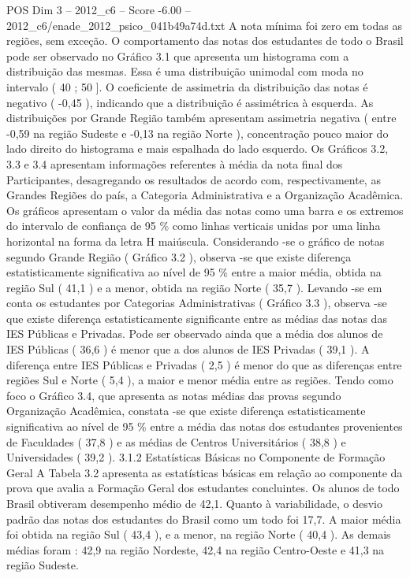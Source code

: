 \begin{textsample}{POS Dim 3 – 2012\_c6 – Score -6.00 – 2012\_c6/enade\_2012\_psico\_041b49a74d.txt}
A nota mínima foi zero em todas as regiões, sem exceção.
O comportamento das notas dos estudantes de todo o Brasil pode ser observado no Gráfico 3.1 que apresenta um histograma com a distribuição das mesmas.
Essa é uma distribuição unimodal com moda no intervalo ( 40 ; 50 ].
O coeficiente de assimetria da distribuição das notas é negativo ( -0,45 ), indicando que a distribuição é assimétrica à esquerda.
As distribuições por Grande Região também apresentam assimetria negativa ( entre -0,59 na região Sudeste e -0,13 na região Norte ), concentração pouco maior do lado direito do histograma e mais espalhada do lado esquerdo.
Os Gráficos 3.2, 3.3 e 3.4 apresentam informações referentes à média da nota final dos Participantes, desagregando os resultados de acordo com, respectivamente, as Grandes Regiões do país, a Categoria Administrativa e a Organização Acadêmica.
Os gráficos apresentam o valor da média das notas como uma barra e os extremos do intervalo de confiança de 95 \% como linhas verticais unidas por uma linha horizontal na forma da letra H maiúscula.
Considerando -se o gráfico de notas segundo Grande Região ( Gráfico 3.2 ), observa -se que existe diferença estatisticamente significativa ao nível de 95 \% entre a maior média, obtida na região Sul ( 41,1 ) e a menor, obtida na região Norte ( 35,7 ).
Levando -se em conta os estudantes por Categorias Administrativas ( Gráfico 3.3 ), observa -se que existe diferença estatisticamente significante entre as médias das notas das IES Públicas e Privadas.
Pode ser observado ainda que a média dos alunos de IES Públicas ( 36,6 ) é menor que a dos alunos de IES Privadas ( 39,1 ).
A diferença entre IES Públicas e Privadas ( 2,5 ) é menor do que as diferenças entre regiões Sul e Norte ( 5,4 ), a maior e menor média entre as regiões.
Tendo como foco o Gráfico 3.4, que apresenta as notas médias das provas segundo Organização Acadêmica, constata -se que existe diferença estatisticamente significativa ao nível de 95 \% entre a média das notas dos estudantes provenientes de Faculdades ( 37,8 ) e as médias de Centros Universitários ( 38,8 ) e Universidades ( 39,2 ). 3.1.2 Estatísticas Básicas no Componente de Formação Geral A Tabela 3.2 apresenta as estatísticas básicas em relação ao componente da prova que avalia a Formação Geral dos estudantes concluintes.
Os alunos de todo Brasil obtiveram desempenho médio de 42,1.
Quanto à variabilidade, o desvio padrão das notas dos estudantes do Brasil como um todo foi 17,7.
A maior média foi obtida na região Sul ( 43,4 ), e a menor, na região Norte ( 40,4 ).
As demais médias foram : 42,9 na região Nordeste, 42,4 na região Centro-Oeste e 41,3 na região Sudeste.

\end{textsample}
